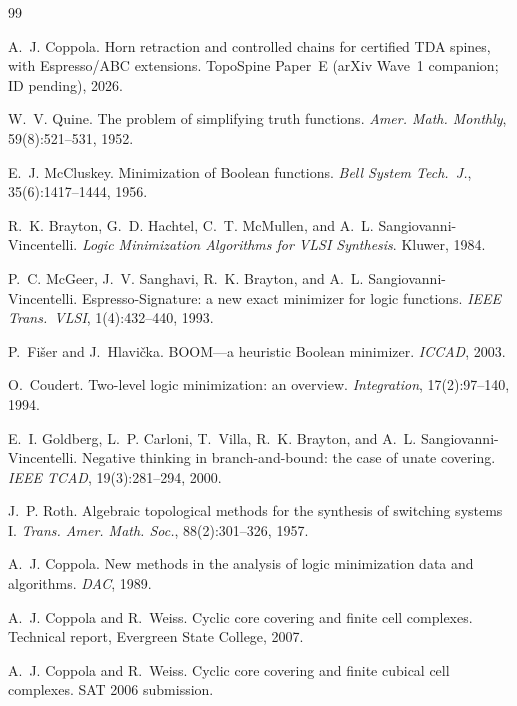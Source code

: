 \documentclass[11pt]{article}
\begin{document}

\begin{thebibliography}{99}

A.~J. Coppola.
\newblock Horn retraction and controlled chains for certified TDA spines, with
Espresso/ABC extensions.
\newblock TopoSpine Paper~E (arXiv Wave~1 companion; ID pending), 2026.

W.~V. Quine.
\newblock The problem of simplifying truth functions.
\newblock \emph{Amer. Math. Monthly}, 59(8):521--531, 1952.

E.~J. McCluskey.
\newblock Minimization of Boolean functions.
\newblock \emph{Bell System Tech.\ J.}, 35(6):1417--1444, 1956.

R.~K. Brayton, G.~D. Hachtel, C.~T. McMullen, and A.~L. Sangiovanni-Vincentelli.
\newblock \emph{Logic Minimization Algorithms for VLSI Synthesis}.
\newblock Kluwer, 1984.

P.~C. McGeer, J.~V. Sanghavi, R.~K. Brayton, and A.~L. Sangiovanni-Vincentelli.
\newblock Espresso-Signature: a new exact minimizer for logic functions.
\newblock \emph{IEEE Trans.\ VLSI}, 1(4):432--440, 1993.

P.~Fi\v{s}er and J.~Hlavi\v{c}ka.
\newblock BOOM---a heuristic Boolean minimizer.
\newblock \emph{ICCAD}, 2003.

O.~Coudert.
\newblock Two-level logic minimization: an overview.
\newblock \emph{Integration}, 17(2):97--140, 1994.

E.~I. Goldberg, L.~P. Carloni, T.~Villa, R.~K. Brayton, and A.~L. Sangiovanni-Vincentelli.
\newblock Negative thinking in branch-and-bound: the case of unate covering.
\newblock \emph{IEEE TCAD}, 19(3):281--294, 2000.

J.~P. Roth.
\newblock Algebraic topological methods for the synthesis of switching systems I.
\newblock \emph{Trans. Amer. Math. Soc.}, 88(2):301--326, 1957.

A.~J. Coppola.
\newblock New methods in the analysis of logic minimization data and algorithms.
\newblock \emph{DAC}, 1989.

A.~J. Coppola and R.~Weiss.
\newblock Cyclic core covering and finite cell complexes.
\newblock Technical report, Evergreen State College, 2007.

A.~J. Coppola and R.~Weiss.
\newblock Cyclic core covering and finite cubical cell complexes.
\newblock SAT 2006 submission.


\end{thebibliography}
\end{document}
